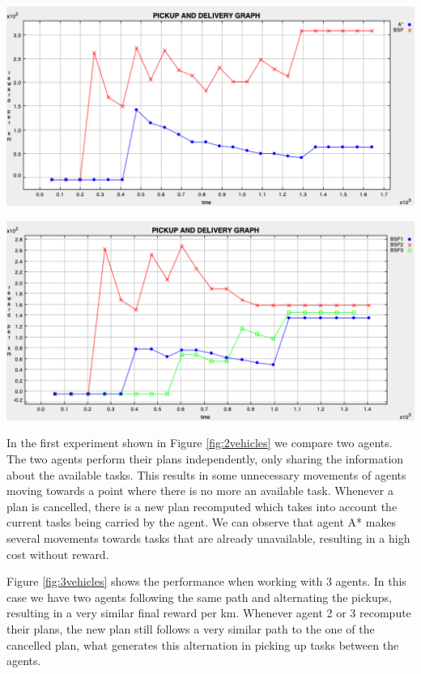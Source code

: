 \documentclass[11pt]{article}
\begin{document}
\begin{minipage}[]{\textwidth}

\begin{minipage}[]{0.48\textwidth}
\includegraphics[width=\textwidth]{plots-deliberative/2vehicles.png}
\label{fig:2vehicles}

\includegraphics[width=\textwidth]{plots-deliberative/3vehicles.png}
\label{fig:3vehicles}
\end{minipage}
\hfill
\begin{minipage}[]{0.5\textwidth}
In the first experiment shown in Figure \ref{fig:2vehicles} we compare two agents. The two agents perform their plans independently, only sharing the information about the available tasks. This results in some unnecessary movements of agents moving towards a point where there is no more an available task. Whenever a plan is cancelled, there is a new plan recomputed which takes into account the current tasks being carried by the agent. We can observe that agent A* makes several movements towards tasks that are already unavailable, resulting in a high cost without reward. 

Figure \ref{fig:3vehicles} shows the performance when working with 3 agents. In this case we have two agents following the same path and alternating the pickups, resulting in a very similar final reward per km. Whenever agent 2 or 3 recompute their plans, the new plan still follows a very similar path to the one of the cancelled plan, what generates this alternation in picking up tasks between the agents. 


\end{minipage}

\end{minipage}
\end{document}
